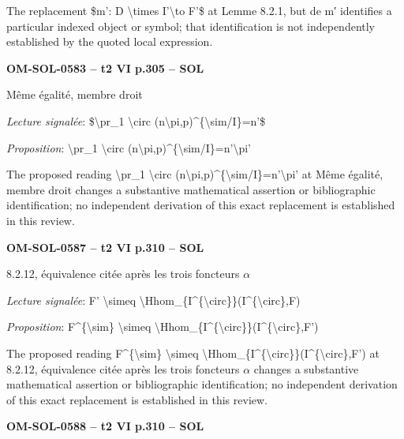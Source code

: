 The replacement \$m': D \textbackslash{}times I'\textbackslash{}to F'\$ at Lemme 8.2.1, but de m′ identifies a particular indexed object or symbol; that identification is not independently established by the quoted local expression.\par
\par\noindent\textbf{OM-SOL-0583 -- t2 VI p.305 -- SOL}\par
Même égalité, membre droit\par
\emph{Lecture signalée}: \$\textbackslash{}pr\_1 \textbackslash{}circ (n\textbackslash{}pi,p)\textasciicircum{}\{\textbackslash{}sim/I\}=\allowbreak n'\$\par
\emph{Proposition}: \textbackslash{}pr\_1 \textbackslash{}circ (n\textbackslash{}pi,p)\textasciicircum{}\{\textbackslash{}sim/I\}=\allowbreak n'\textbackslash{}pi'\par
The proposed reading \textbackslash{}pr\_1 \textbackslash{}circ (n\textbackslash{}pi,p)\textasciicircum{}\{\textbackslash{}sim/I\}=\allowbreak n'\textbackslash{}pi' at Même égalité, membre droit changes a substantive mathematical assertion or bibliographic identification; no independent derivation of this exact replacement is established in this review.\par
\par\noindent\textbf{OM-SOL-0587 -- t2 VI p.310 -- SOL}\par
8.2.12, équivalence citée après les trois foncteurs \ensuremath{\alpha}\par
\emph{Lecture signalée}: F' \textbackslash{}simeq \textbackslash{}Hhom\_\{I\textasciicircum{}\{\textbackslash{}circ\}\}(I\textasciicircum{}\{\textbackslash{}circ\},F)\par
\emph{Proposition}: F\textasciicircum{}\{\textbackslash{}sim\} \textbackslash{}simeq \textbackslash{}Hhom\_\{I\textasciicircum{}\{\textbackslash{}circ\}\}(I\textasciicircum{}\{\textbackslash{}circ\},F')\par
The proposed reading F\textasciicircum{}\{\textbackslash{}sim\} \textbackslash{}simeq \textbackslash{}Hhom\_\{I\textasciicircum{}\{\textbackslash{}circ\}\}(I\textasciicircum{}\{\textbackslash{}circ\},F') at 8.2.12, équivalence citée après les trois foncteurs \ensuremath{\alpha} changes a substantive mathematical assertion or bibliographic identification; no independent derivation of this exact replacement is established in this review.\par
\par\noindent\textbf{OM-SOL-0588 -- t2 VI p.310 -- SOL}\par
